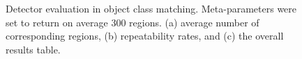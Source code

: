 \documentclass[10pt,journal,cspaper,compsoc]{IEEEtran}
\begin{document}
\begin{figure}[h]
\begin{center}
\caption{Detector evaluation in object class matching. Meta-parameters were set to return
on average 300 regions.
(a) average number of corresponding regions,
(b) repeatability rates,
and (c) the overall results table.\label{fig:results1}}
\end{center}
\end{figure}
\end{document}
